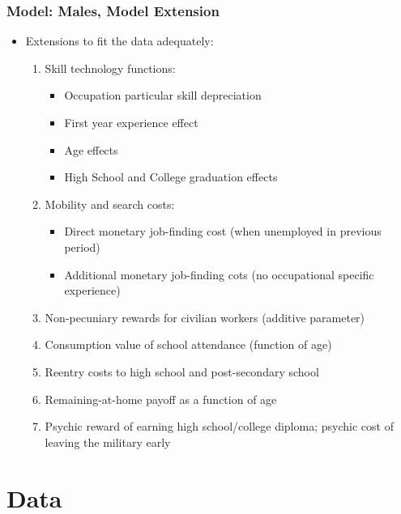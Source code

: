 \begin{frame}
	\frametitle{Model: Males, Model Extension}
	\begin{itemize}
		\item Extensions to fit the data adequately:
		\begin{enumerate}
		\item Skill technology functions:
			\begin{itemize}
				\item Occupation particular skill depreciation
				\item First year experience effect
				\item Age effects
				\item High School and College graduation effects
			\end{itemize}
		\item Mobility and search costs:
			\begin{itemize}
				\item Direct monetary job-finding cost (when unemployed in previous period)
				\item Additional monetary job-finding cots (no occupational specific experience)
			\end{itemize}
		\item Non-pecuniary rewards for civilian workers (additive parameter)
		\item Consumption value of school attendance (function of age)
		\item Reentry costs to high school and post-secondary school
		\item Remaining-at-home payoff as a function of age
		\item Psychic reward of earning high school/college diploma; psychic cost of leaving the military early
		\end{enumerate}
	\end{itemize}
\end{frame}

\section{Data}

